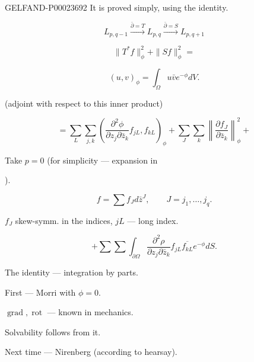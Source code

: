 \begin{GelfandAdjacentEvidence}{GELFAND-P000236}{92}
It is proved simply, using the identity.



\begin{equation*}
 L_{p, q-1}\overset{\bar\partial=T}{\longrightarrow}L_{p, q}
 \overset{\bar\partial=S}{\longrightarrow}L_{p, q+1}
\end{equation*}



\begin{equation*}
 \|T^*f\|_\phi^2+\|Sf\|_\phi^2=
\end{equation*}



\begin{equation*}
 (u, v)_\phi=\int_\Omega u\bar v e^{-\phi}dV.
\end{equation*}



(adjoint with respect to this inner product)



\begin{equation*}
 =\sum_L\sum_{j, k}\left (\frac{\partial^2\phi}{\partial z_j\partial\bar z_k}f_{jL}, f_{kL}\right)_\phi
 +\sum_J\sum_k\left\|\frac{\partial f_J}{\partial\bar z_k}\right\|_\phi^2+
\end{equation*}




Take $p=0$ (for simplicity — expansion in 

).

\begin{equation*}
 f=\sum f_Jd\bar z^J,\qquad J=j_1,\ldots, j_q.
\end{equation*}



$f_J$ skew-symm. in the indices, $jL$ — long index.



\begin{equation*}
 +\sum\sum\int_{\partial\Omega}\frac{\partial^2\rho}{\partial z_j\partial\bar z_k}f_{jL}\overline{f_{kL}}e^{-\phi}dS.
\end{equation*}



The identity — integration by parts.



First — Morri with $\phi=0$.



$\operatorname{grad},\operatorname{rot}$ — known in mechanics.



Solvability follows from it.



Next time — Nirenberg (according to hearsay).




\end{GelfandAdjacentEvidence}


